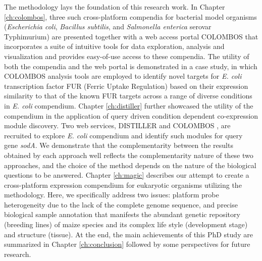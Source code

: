 %
%
The methodology lays the foundation of this research work.
%
%
%
In Chapter \ref{ch:colombos}, three such cross-platform compendia for
bacterial model organisms (\textit{Escherichia coli}, \textit{Bacillus
  subtilis}, and \textit{Salmonella enterica} serovar Typhimurium) are
presented together with a web access portal COLOMBOS that incorporates a
suite of intuitive tools for data exploration, analysis and visualization
and provides easy-of-use access to these compendia.
%
The utility of both the compendia and the web portal is demonstrated in a
case study, in which COLOMBOS analysis tools are employed to identify novel
targets for \textit{E. coli} transcription factor FUR (Ferric Uptake
Regulation) based on their expression similarity to that of the known FUR
targets across a range of diverse conditions in \textit{E. coli} compendium.
%
Chapter \ref{ch:distiller} further showcased the utility of the compendium
in the application of query driven condition dependent co-expression module
discovery.
%
Two web services, DISTILLER \cite{Lemmens2009} and COLOMBOS
\cite{Engelen2011}, are recruited to explore \textit{E. coli}
compendium and identify such modules for query gene \textit{sodA}.
%
We demonstrate that the complementarity between the results obtained by
each approach well reflects the complementarity nature of these two
approaches, and the choice of the method depends on the nature of the
biological questions to be answered.
%
%
%
Chapter \ref{ch:magic} describes our attempt to create a
cross-platform expression compendium for eukaryotic organisms utilizing the
methodology.
%
Here, we specifically address two issues: platform probe heterogeneity due
to the lack of the complete genome sequence, and precise biological sample
annotation that manifests the abundant genetic repository (breeding lines)
of maize species and its complex life style (development stage) and
structure (tissue).
%
%
%
At the end, the main achievements of this PhD study are summarized in
Chapter \ref{ch:conclusion} followed by some perspectives for future
research.










